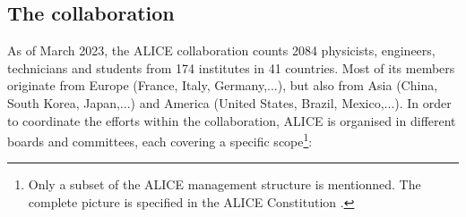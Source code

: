 \subsection{The collaboration}

As of March 2023, the ALICE collaboration counts 2084 physicists, engineers, technicians and students from 174 institutes in 41 countries. Most of its members originate from Europe (France, Italy, Germany,...), but also from Asia (China, South Korea, Japan,...) and America (United States, Brazil, Mexico,...). In order to coordinate the efforts within the collaboration, ALICE is organised in different boards and committees, each covering a specific scope\footnote{Only a subset of the ALICE management structure is mentionned. The complete picture is specified in the ALICE Constitution \cite{alicecollaborationALICECollaboration}.}:

